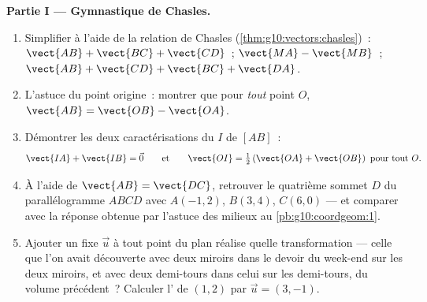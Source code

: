 \begin{problem}
\medskip
\noindent\textbf{Partie I --- Gymnastique de Chasles.}
\begin{enumerate}
  \item Simplifier à l'aide de la relation de Chasles
        (\cref{thm:g10:vectors:chasles})~:
        $\vect{AB} + \vect{BC} + \vect{CD}$~; \quad
        $\vect{MA} - \vect{MB}$~; \quad
        $\vect{AB} + \vect{CD} + \vect{BC} + \vect{DA}$.
  \item L'astuce du point origine~: montrer que pour \emph{tout}
        point $O$, $\vect{AB} = \vect{OB} - \vect{OA}$.
  \item Démontrer les deux caractérisations du  $I$ de
        $[AB]$~:
        \[
        \vect{IA} + \vect{IB} = \vec 0
        \qquad\text{et}\qquad
        \vect{OI} = \tfrac12\left(\vect{OA} + \vect{OB}\right)
        \ \text{pour tout } O .
        \]
  \item À l'aide de $\vect{AB} = \vect{DC}$, retrouver le quatrième
        sommet $D$ du parallélogramme $ABCD$ avec $A(-1, 2)$,
        $B(3, 4)$, $C(6, 0)$ --- et comparer avec la réponse obtenue
        par l'astuce des milieux au \cref{pb:g10:coordgeom:1}.
  \item Ajouter un  fixe $\vec u$ à tout point du plan
        réalise quelle transformation --- celle que l'on avait
        découverte avec deux miroirs dans le devoir du week-end sur
        les deux miroirs, et avec deux demi-tours dans celui sur les
        demi-tours, du volume précédent~? Calculer l' de
        $(1, 2)$ par $\vec u = (3, -1)$.
\end{enumerate}


\end{problem}
